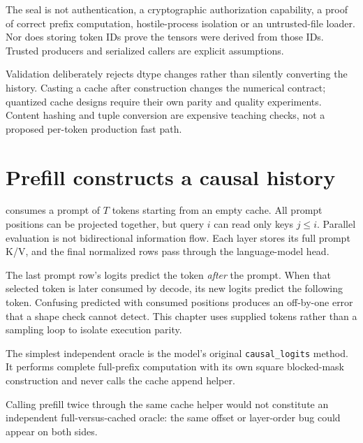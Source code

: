 The seal is not authentication, a cryptographic authorization capability,
a proof of correct prefix computation, hostile-process isolation or an
untrusted-file loader. Nor does storing token IDs prove the tensors were
derived from those IDs. Trusted producers and serialized callers are explicit
assumptions.


Validation deliberately rejects dtype changes rather than silently converting
the history. Casting a cache after construction changes the numerical
contract; quantized cache designs require their own parity and quality
experiments. Content hashing and tuple conversion are expensive teaching
checks, not a proposed per-token production fast path.

\section{Prefill constructs a causal history}
\label{evod35:prefill}
 consumes a prompt of $T$ tokens starting from an empty cache.
All prompt positions can be projected together, but query $i$ can read only
keys $j\le i$. Parallel evaluation is not bidirectional information flow.
Each layer stores its full prompt K/V, and the final normalized rows pass
through the language-model head.

The last prompt row's logits predict the token \emph{after} the prompt. When
that selected token is later consumed by decode, its new logits predict the
following token. Confusing predicted with consumed positions produces an
off-by-one error that a shape check cannot detect. This chapter uses supplied
tokens rather than a sampling loop to isolate execution parity.


The simplest independent oracle is the model's original
\texttt{causal\_logits} method. It performs complete full-prefix computation
with its own square blocked-mask construction and never calls the cache
append helper.

Calling prefill twice through the same cache helper would not constitute
an independent full-versus-cached oracle: the same offset or layer-order bug
could appear on both sides.

